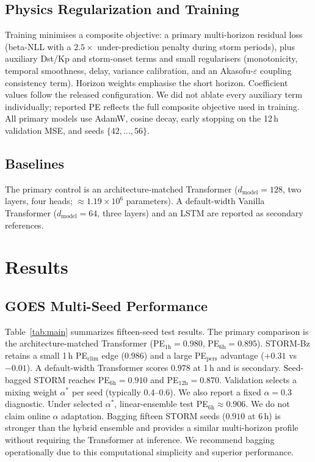 \documentclass[conference]{IEEEtran}
\begin{document}
\subsection{Physics Regularization and Training}
Training minimises a composite objective: a primary multi-horizon residual loss (beta-NLL with a \(2.5\times\) under-prediction penalty during storm periods), plus auxiliary Dst/Kp and storm-onset terms and small regularisers (monotonicity, temporal smoothness, delay, variance calibration, and an Akasofu-\(\varepsilon\) coupling consistency term). Horizon weights emphasise the short horizon. Coefficient values follow the released configuration. We did not ablate every auxiliary term individually; reported PE reflects the full composite objective used in training. All primary models use AdamW, cosine decay, early stopping on the 12\,h validation MSE, and seeds \(\{42,\ldots,56\}\).

\subsection{Baselines}
The primary control is an architecture-matched Transformer
($d_{\mathrm{model}}=128$, two layers, four heads;
$\approx1.19\times10^{6}$ parameters). A default-width Vanilla Transformer
($d_{\mathrm{model}}=64$, three layers) and an LSTM are reported as
secondary references.




\section{Results}
\label{sec:results}

\subsection{GOES Multi-Seed Performance}
Table~\ref{tab:main} summarizes fifteen-seed test results.
The primary comparison is the architecture-matched Transformer
(PE$_{1\mathrm{h}}=0.980$, PE$_{6\mathrm{h}}=0.895$).
STORM-Bz retains a small 1\,h PE$_{\mathrm{clim}}$ edge ($0.986$)
and a large PE$_{\mathrm{pers}}$ advantage ($+0.31$ vs $-0.01$).
A default-width Transformer scores $0.978$ at 1\,h and is secondary.
Seed-bagged STORM reaches PE$_{6\mathrm{h}}=0.910$ and PE$_{12\mathrm{h}}=0.870$.
Validation selects a mixing weight \(\alpha^*\) per seed (typically 0.4--0.6). We also report a fixed \(\alpha=0.3\) diagnostic. Under selected \(\alpha^*\), linear-ensemble test PE\(_{6\mathrm{h}} \approx 0.906\). We do not claim online \(\alpha\) adaptation.
Bagging fifteen STORM seeds (\(0.910\) at 6\,h) is stronger than the hybrid ensemble and provides a similar multi-horizon profile without requiring the Transformer at inference. We recommend bagging operationally due to this computational simplicity and superior performance.
\end{document}
